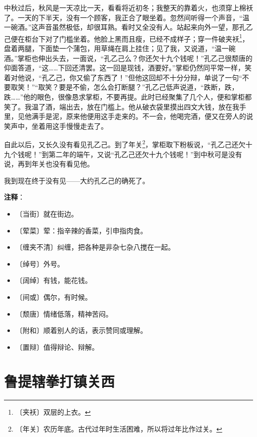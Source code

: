 \documentclass[12pt,UTF-8,openany]{ctexbook}
\begin{document}
\begin{large}
    中秋过后，秋风是一天凉比一天，看看将近初冬；我整天的靠着火，也须穿上棉袄了。一天的下半天，没有一个顾客，我正合了眼坐着。忽然间听得一个声音，“温一碗酒。”这声音虽然极低，却很耳熟。看时又全没有人。站起来向外一望，那孔乙己便在柜台下对了门槛坐着。他脸上黑而且瘦，已经不成样子；穿一件破夹袄\footnote{〔夹袄〕双层的上衣。}，盘着两腿，下面垫一个蒲包，用草绳在肩上挂住；见了我，又说道，“温一碗酒。”掌柜也伸出头去，一面说，“孔乙己么？你还欠十九个钱呢！”孔乙己很颓唐的仰面答道，“这……下回还清罢。这一回是现钱，酒要好。”掌柜仍然同平常一样，笑着对他说，“孔乙己，你又偷了东西了！”但他这回却不十分分辩，单说了一句“不要取笑！”“取笑？要是不偷，怎么会打断腿？”孔乙己低声说道，“跌断，跌，跌……”他的眼色，很像恳求掌柜，不要再提。此时已经聚集了几个人，便和掌柜都笑了。我温了酒，端出去，放在门槛上。他从破衣袋里摸出四文大钱，放在我手里，见他满手是泥，原来他便用这手走来的。不一会，他喝完酒，便又在旁人的说笑声中，坐着用这手慢慢走去了。
    
    自此以后，又长久没有看见孔乙己。到了年关\footnote{〔年关〕农历年底。古代过年时生活困难，所以将过年比作过关。}，掌柜取下粉板说，“孔乙己还欠十九个钱呢！”到第二年的端午，又说“孔乙己还欠十九个钱呢！”到中秋可是没有说，再到年关也没有看见他。
    
    我到现在终于没有见——大约孔乙己的确死了。
    
\end{large}


\newpage

\textbf{注释}：

\vspace{-1em}

\begin{itemize}
    \setlength\itemsep{-0.2em}
    \item 〔当街〕就在街边。
    \item 〔荤菜〕荤：指辛辣的香菜，引申指肉食。
    \item 〔缠夹不清〕纠缠，把各种是非杂七杂八搅在一起。
    \item 〔绰号〕外号。
    \item 〔阔绰〕有钱，能花钱。
    \item 〔间或〕偶尔，有时候。
    \item 〔颓唐〕情绪低落，精神苦闷。
    \item 〔附和〕顺着别人的话，表示赞同或理解。
    \item 〔置辩〕值得辩论、辩解。
\end{itemize}

\chapter{鲁提辖拳打镇关西}
\end{document}
